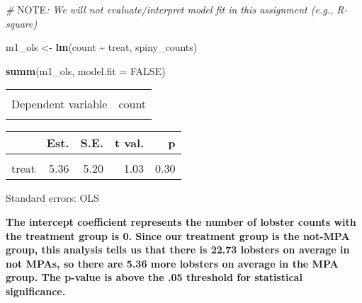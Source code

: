 \documentclass[
]{article}
\newenvironment{Shaded}{\begin{snugshade}}{\end{snugshade}}
\newcommand{\AlertTok}[1]{\textcolor[rgb]{0.94,0.16,0.16}{#1}}
\newcommand{\AttributeTok}[1]{\textcolor[rgb]{0.13,0.29,0.53}{#1}}
\newcommand{\CommentTok}[1]{\textcolor[rgb]{0.56,0.35,0.01}{\textit{#1}}}
\newcommand{\ConstantTok}[1]{\textcolor[rgb]{0.56,0.35,0.01}{#1}}
\newcommand{\FunctionTok}[1]{\textcolor[rgb]{0.13,0.29,0.53}{\textbf{#1}}}
\newcommand{\NormalTok}[1]{#1}
\newcommand{\OtherTok}[1]{\textcolor[rgb]{0.56,0.35,0.01}{#1}}
\newcommand{\SpecialCharTok}[1]{\textcolor[rgb]{0.81,0.36,0.00}{\textbf{#1}}}
\begin{document}
\begin{Shaded}
\begin{Highlighting}[]
\CommentTok{\# }\AlertTok{NOTE}\CommentTok{: We will not evaluate/interpret model fit in this assignment (e.g., R{-}square)}

\NormalTok{m1\_ols }\OtherTok{\textless{}{-}} \FunctionTok{lm}\NormalTok{(count }\SpecialCharTok{\textasciitilde{}}\NormalTok{ treat, spiny\_counts)}

\FunctionTok{summ}\NormalTok{(m1\_ols, }\AttributeTok{model.fit =} \ConstantTok{FALSE}\NormalTok{) }
\end{Highlighting}
\end{Shaded}

\begin{table}[!h]
\centering
\begin{tabular}{lr}
\toprule
\cellcolor{gray!10}{Observations} & \cellcolor{gray!10}{252}\\
Dependent variable & count\\
\cellcolor{gray!10}{Type} & \cellcolor{gray!10}{OLS linear regression}\\
\bottomrule
\end{tabular}
\end{table}  \begin{table}[!h]
\centering
\begin{threeparttable}
\begin{tabular}{lrrrr}
\toprule
  & Est. & S.E. & t val. & p\\
\midrule
\cellcolor{gray!10}{(Intercept)} & \cellcolor{gray!10}{22.73} & \cellcolor{gray!10}{3.57} & \cellcolor{gray!10}{6.36} & \cellcolor{gray!10}{0.00}\\
treat & 5.36 & 5.20 & 1.03 & 0.30\\
\bottomrule
\end{tabular}
\begin{tablenotes}
\item Standard errors: OLS
\end{tablenotes}
\end{threeparttable}
\end{table}

\textbf{The intercept coefficient represents the number of lobster
counts with the treatment group is 0. Since our treatment group is the
not-MPA group, this analysis tells us that there is 22.73 lobsters on
average in not MPAs, so there are 5.36 more lobsters on average in the
MPA group. The p-value is above the .05 threshold for statistical
significance.}
\end{document}
